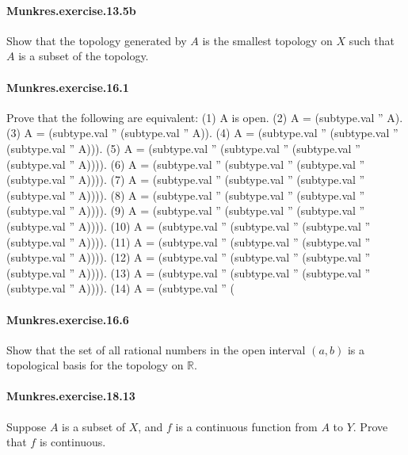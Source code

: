\documentclass{article}
\begin{document}
\paragraph{Munkres.exercise.13.5b} Show that the topology generated by $A$ is the smallest topology on $X$ such that $A$ is a subset of the topology.


\paragraph{Munkres.exercise.16.1} Prove that the following are equivalent:
  (1) A is open.
  (2) A = (subtype.val '' A).
  (3) A = (subtype.val '' (subtype.val '' A)).
  (4) A = (subtype.val '' (subtype.val '' (subtype.val '' A))).
  (5) A = (subtype.val '' (subtype.val '' (subtype.val '' (subtype.val '' A)))).
  (6) A = (subtype.val '' (subtype.val '' (subtype.val '' (subtype.val '' A)))).
  (7) A = (subtype.val '' (subtype.val '' (subtype.val '' (subtype.val '' A)))).
  (8) A = (subtype.val '' (subtype.val '' (subtype.val '' (subtype.val '' A)))).
  (9) A = (subtype.val '' (subtype.val '' (subtype.val '' (subtype.val '' A)))).
  (10) A = (subtype.val '' (subtype.val '' (subtype.val '' (subtype.val '' A)))).
  (11) A = (subtype.val '' (subtype.val '' (subtype.val '' (subtype.val '' A)))).
  (12) A = (subtype.val '' (subtype.val '' (subtype.val '' (subtype.val '' A)))).
  (13) A = (subtype.val '' (subtype.val '' (subtype.val '' (subtype.val '' A)))).
  (14) A = (subtype.val '' (

\paragraph{Munkres.exercise.16.6} Show that the set of all rational numbers in the open interval $(a, b)$ is a topological basis for the topology on $\mathbb{R}$.


\paragraph{Munkres.exercise.18.13} Suppose $A$ is a subset of $X$, and $f$ is a continuous function from $A$ to $Y$. Prove that $f$ is continuous.
\end{document}
